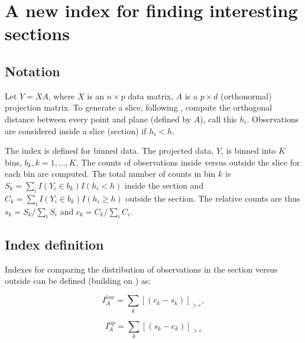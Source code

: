 \documentclass[]{interact}
\theoremstyle{plain}%
\theoremstyle{definition}
\theoremstyle{remark}
\begin{document}
\hypertarget{a-new-index-for-finding-interesting-sections}{%
\section{\texorpdfstring{A new index for finding interesting sections
\label{sec:index}}{A new index for finding interesting sections }}\label{a-new-index-for-finding-interesting-sections}}

\hypertarget{notation}{%
\subsection{Notation}\label{notation}}

Let \(Y=XA\), where \(X\) is an \(n\times p\) data matrix, \(A\) is a
\(p\times d\) (orthonormal) projection matrix. To generate a slice,
following \citet{laa2019slice}, compute the orthogonal distance between
every point and plane (defined by \(A\)), call this \(h_i\).
Observations are considered inside a slice (section) if \(h_i < h\).

The index is defined for binned data. The projected data, \(Y\), is
binned into \(K\) bins, \(b_k, k=1, ..., K\). The counts of observations
inside versus outside the slice for each bin are computed. The total
number of counts in bin \(k\) is
\(S_{k}=\sum_{i} I(Y_i \in b_{k})I(h_i < h)\) inside the section and
\(C_{k}=\sum_{i} I(Y_i \in b_{k})I(h_i \geq h)\) outside the section.
The relative counts are thus \(s_k = S_k / \sum_i S_i\) and
\(c_k = C_k / \sum_i C_i\).

\hypertarget{index-definition}{%
\subsection{Index definition}\label{index-definition}}

Indexes for comparing the distribution of observations in the section
versus outside can be defined (building on
\citet{doi:10.1198/1061860043119}) as:

\begin{equation}
I_A^{low} = \sum_{k}\left[\left(c_{k}-s_{k}\right)\right]_{>\varepsilon},
\label{eq:index}
\end{equation}

\begin{equation}
I_A^{up} = \sum_{k}\left[\left(s_{k}-c_{k}\right)\right]_{>\varepsilon}
\label{eq:indexup}
\end{equation}
\end{document}
